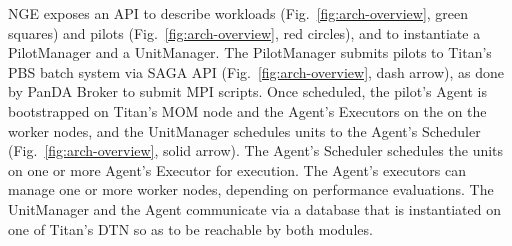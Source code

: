 

NGE exposes an API to describe workloads (Fig.~\ref{fig:arch-overview}, green
squares) and pilots (Fig.~\ref{fig:arch-overview}, red circles), and to
instantiate a PilotManager and a UnitManager.   The PilotManager submits
pilots to Titan's PBS  batch system via SAGA API (Fig.~\ref{fig:arch-overview}, dash arrow), as done by PanDA Broker to submit MPI scripts. Once
scheduled, the pilot's Agent is bootstrapped on Titan's MOM node and
the Agent's Executors on the on the worker
nodes, and the UnitManager schedules units to the Agent's Scheduler
(Fig.~\ref{fig:arch-overview}, solid arrow). The Agent's Scheduler schedules
the units on one or more Agent's Executor for execution. The Agent's executors
can manage one or more worker nodes, depending on performance evaluations. The
UnitManager and the Agent communicate via a database that is instantiated on
one of Titan's DTN so as to be reachable by both modules.






